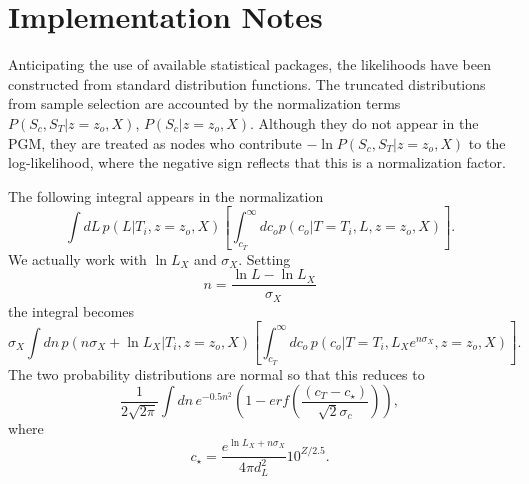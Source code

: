 \documentclass[preprint,3p]{elsarticle}
\begin{document}
\section{Implementation Notes}
Anticipating the use of available statistical packages, the likelihoods have been constructed
from standard distribution functions.  The truncated distributions from sample selection
are accounted by the normalization 
terms $P(S_c, S_T| z=z_o, X)$, $P(S_c| z=z_o, X)$.  Although they do not appear
in the PGM, they are treated as nodes who contribute 
$-\ln{P(S_c, S_T| z=z_o, X)}$ to the log-likelihood, where the negative sign reflects that this is a normalization
factor.


The following integral appears in the normalization
\begin{equation}
\int dL\, p(L|T_i, z=z_o, X)  \left[\int_{c_T}^{\infty} dc_o  p(c_o | T=T_i, L, z=z_o, X)\right].
\end{equation}
We actually work with $\ln{L_X}$ and $\sigma_X$.  Setting
\begin{equation}
n=\frac{\ln{L}-\ln{L_X}}{\sigma_X}
\end{equation}
the integral becomes
 \begin{equation}
\sigma_X \int dn\, p(n\sigma_X + \ln{L_X} |T_i, z=z_o, X)  \left[\int_{c_T}^{\infty} dc_o\,  p(c_o | T=T_i, L_Xe^{n\sigma_X}, z=z_o, X)\right].
\end{equation}
The two probability distributions are normal so that this reduces to
 \begin{equation}
\frac{1}{2\sqrt{2\pi}} \int dn\, e^{-0.5n^2} \left(1-erf\left(\frac{(c_T - c_\star)}{\sqrt{2}\sigma_c}\right)\right),
\end{equation}
where
\begin{equation}
c_\star = \frac{e^{\ln{L_X}+n\sigma_X}}{4\pi d_L^2}10^{Z/2.5}.
\end{equation}
\end{document}
